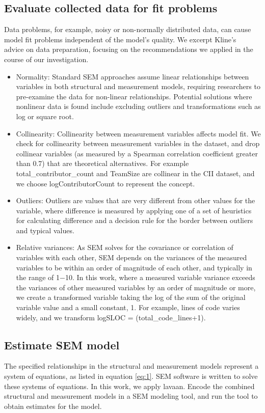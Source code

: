 \subsection{Evaluate collected data for fit problems}
Data problems, for example, noisy or non-normally distributed data, can cause model fit problems independent of the model's quality. We excerpt Kline's~\cite{kline2015principles} advice on data preparation, focusing on the recommendations we applied in the course of our investigation. 
\begin{itemize}
\item{Normality}:
Standard SEM approaches assume linear relationships between variables in both structural and measurement models, requiring researchers to pre-examine the data for non-linear relationships. Potential solutions where nonlinear data is found include excluding outliers and transformations such as log or square root.
\item{Collinearity}:
Collinearity between measurement variables affects model fit. We check for collinearity between measurement variables in the dataset, and drop collinear variables (as measured by a Spearman correlation coefficient greater than 0.7) that are theoretical alternatives. For example total\_contributor\_count and TeamSize are collinear in the CII dataset, and we choose logContributorCount to represent the concept.
\item{Outliers}:
Outliers are values that are very different from other values for the variable, where difference is measured by applying one of a set of heuristics for calculating difference and a decision rule for the border between outliers and typical values. 
\item{Relative variances}:
As SEM solves for the covariance or correlation of variables with each other, SEM depends on the variances of the measured variables to be within an order of magnitude of each other, and typically in the range of 1$-$10. In this work, where a measured variable variance exceeds the variances of other measured variables by an order of magnitude or more, we create a transformed variable taking the log of the sum of the original variable value and a small constant, 1. For example, lines of code varies widely, and  we transform logSLOC = (total\_code\_lines+1).
\end{itemize}

\subsection{Estimate SEM model} 
The specified relationships in the structural and measurement models represent a system of equations, as listed in equation \ref{eq:1}. SEM software is written to solve these systems of equations. In this work, we apply lavaan.  Encode the combined structural and measurement models in a SEM modeling tool, and run the tool to obtain estimates for the model. 

